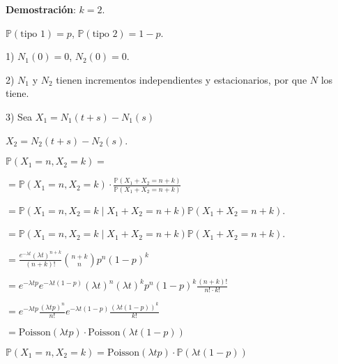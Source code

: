 \documentclass[12pt]{article}
\begin{document}
\textbf{Demostración}: $k = 2$.

$\mathbb{P}(\text{tipo } 1) = p$, $\mathbb{P}(\text{tipo } 2) = 1 - p$.

1) $N_1(0) = 0$, $N_2(0) = 0$.

2) $N_1$ y $N_2$ tienen incrementos independientes y estacionarios, por que $N$ los tiene.

3) Sea $X_1 = N_1(t+s) - N_1(s)$

$X_2 = N_2(t+s) - N_2(s)$.

$\mathbb{P}(X_1 = n, X_2 = k) =$

$= \mathbb{P}(X_1 = n, X_2 = k) \cdot \frac{\mathbb{P}(X_1 + X_2 = n+k)}{\mathbb{P}(X_1 + X_2 = n+k)}$

$= \mathbb{P}(X_1 = n, X_2 = k \mid X_1 + X_2 = n+k) \mathbb{P}(X_1 + X_2 = n+k)$.

$= \mathbb{P}(X_1 = n, X_2 = k \mid X_1 + X_2 = n+k) \mathbb{P}(X_1 + X_2 = n+k)$.

$= \frac{e^{-\lambda t} (\lambda t)^{n+k}}{(n+k)!} \binom{n+k}{n} p^n (1-p)^k$

\begin{center}
\end{center}

$= e^{-\lambda t p} e^{-\lambda t(1-p)} (\lambda t)^n (\lambda t)^k p^n (1-p)^k \frac{(n+k)!}{n! \cdot k!}$

$= e^{-\lambda t p} \frac{(\lambda t p)^n}{n!} e^{-\lambda t(1-p)} \frac{(\lambda t(1-p))^k}{k!}$

$= \text{Poisson}(\lambda t p) \cdot \text{Poisson}(\lambda t(1-p))$

$\mathbb{P}(X_1 = n, X_2 = k) = \text{Poisson}(\lambda t p) \cdot \mathbb{P}(\lambda t(1-p))$

\vspace{1cm}
\end{document}

